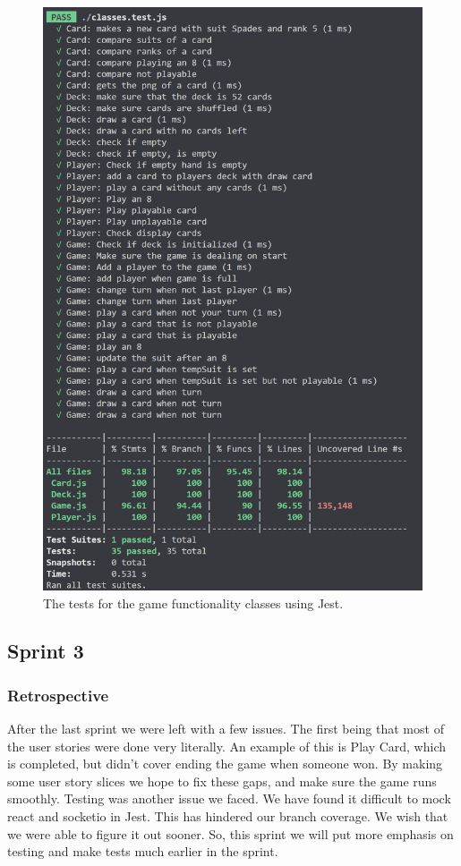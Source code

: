 \documentclass{article}
\begin{document}
\begin{figure}[h]
\centering
\includegraphics[width=\linewidth]{testss2_3.png}
\caption{\label{fig:testss2_3}The tests for the game functionality classes using Jest.}
\end{figure}

\subsection{Sprint 3}

\subsubsection{Retrospective}
After the last sprint we were left with a few issues. The first being that most of the user stories were done very literally. An example of this is Play Card, which is completed, but didn't cover ending the game when someone won. By making some user story slices we hope to fix these gaps, and make sure the game runs smoothly. Testing was another issue we faced. We have found it difficult to mock react and socketio in Jest. This has hindered our branch coverage. We wish that we were able to figure it out sooner. So, this sprint we will put more emphasis on testing and make tests much earlier in the sprint.
\end{document}
